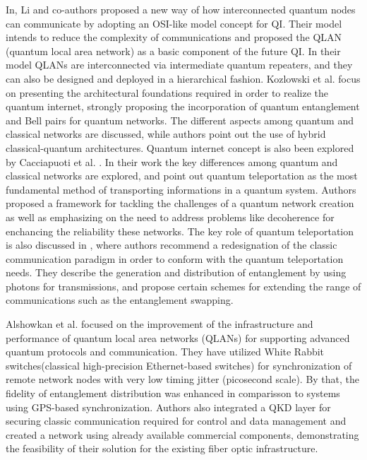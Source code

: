 \documentclass[12pt]{ieeetj}
\begin{document}
		In\cite{li-arch}, Li and co-authors proposed a new way of how interconnected
		quantum nodes can communicate by adopting an OSI-like
		model concept for QI. Their model intends to reduce the complexity of communications
		and proposed the QLAN (quantum local area network) as a basic component of the future QI. In their model
		QLANs are interconnected via intermediate quantum repeaters, and they can also be designed and deployed in
		a hierarchical fashion.
		Kozlowski et al. \cite{rfc} focus on presenting the architectural foundations required in order to
		realize the quantum internet, strongly proposing the incorporation of quantum entanglement and Bell pairs for quantum networks. 
		The different aspects among quantum and classical networks are discussed, while authors point out the use of hybrid
		classical-quantum architectures. Quantum internet concept is also been explored by Cacciapuoti et al. \cite{net-chall-dqc}.
		In their work the key differences among quantum and classical
		networks are explored, and point out quantum teleportation as the most fundamental method of transporting 
		informations in a quantum system. Authors proposed a framework for tackling the challenges of a quantum
		network creation as well as emphasizing on the need to address problems like decoherence for enchancing the
		reliability these networks. The key role of quantum teleportation is also discussed in \cite{entagl-classic},
		where authors recommend a redesignation of the classic communication paradigm in order to conform with the quantum teleportation needs.
		They describe the generation and distribution of entanglement by using photons for transmissions, and propose certain schemes for extending
		the range of communications such as the entanglement swapping.
		
		Alshowkan et al.\cite{advance-arch} focused on the improvement of the infrastructure 
		and performance of quantum local area networks (QLANs) for supporting advanced quantum protocols
		and communication. They have utilized White Rabbit switches(classical high-precision Ethernet-based switches) for synchronization
		of remote network nodes with very low timing jitter (picosecond scale). 
		By that, the fidelity of entanglement distribution was enhanced in comparisson to systems using GPS-based synchronization.
		Authors also integrated a QKD layer for securing classic communication required for control and data management and
		created a network using already available commercial components, demonstrating the feasibility of their solution
		for the existing fiber optic infrastructure.
\end{document}

